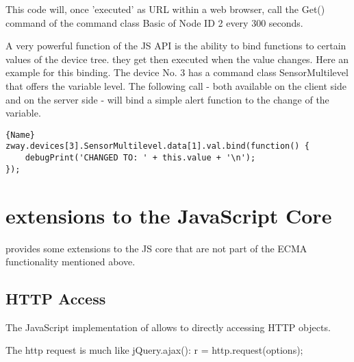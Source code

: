 This code will, once 'executed' as URL within a web browser, call the Get() command
of the command class Basic of Node ID 2 every 300 seconds.  

A very powerful function of the JS API is the ability to bind functions to certain
values of the device tree. they get then executed when the value changes. Here an 
example for this binding. The device No. 3 has a command class SensorMultilevel that offers
the variable level. The following call - both available on the client side 
and on the server side - will bind a simple alert function to the change of 
the variable.

\begin{lstlisting}[caption=Bind a function, basicstyle=\small,columns=fullflexible]{Name}
zway.devices[3].SensorMultilevel.data[1].val.bind(function() { 
	debugPrint('CHANGED TO: ' + this.value + '\n'); 
});  
\end{lstlisting}



\section{\zway extensions to the JavaScript Core}

\zway provides some extensions to the JS core that are not part of the ECMA 
functionality mentioned above.

\subsection{HTTP Access}

The JavaScript implementation of \zway allows to directly accessing HTTP objects.

The http request is much like jQuery.ajax(): r = http.request(options);

